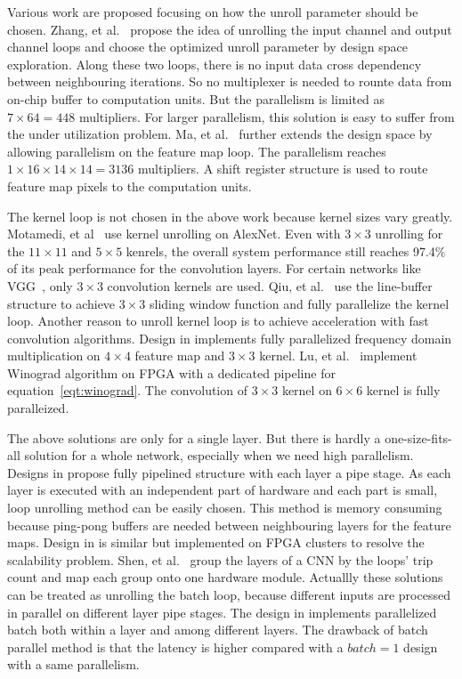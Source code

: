 Various work are proposed focusing on how the unroll parameter should be chosen. Zhang, et al.~\cite{zhang2015optimizing} propose the idea of unrolling the input channel and output channel loops and choose the optimized unroll parameter by design space exploration. Along these two loops, there is no input data cross dependency between neighbouring iterations. So no multiplexer is needed to rounte data from on-chip buffer to computation units. But the parallelism is limited as $7\times 64=448$ multipliers. For larger parallelism, this solution is easy to suffer from the under utilization problem. Ma, et al.~\cite{ma2017optimizing} further extends the design space by allowing parallelism on the feature map loop. The parallelism reaches $1\times 16\times 14\times 14=3136$ multipliers. A shift register structure is used to route feature map pixels to the computation units.

The kernel loop is not chosen in the above work because kernel sizes vary greatly. Motamedi, et al~\cite{motamedi2016design} use kernel unrolling on AlexNet. Even with $3\times 3$ unrolling for the $11\times 11$ and $5\times 5$ kenrels, the overall system performance still reaches 97.4\% of its peak performance for the convolution layers. For certain networks like VGG~\cite{simonyan2014very}, only $3\times 3$ convolution kernels are used.  Qiu, et al.~\cite{qiu2016going} use the line-buffer structure to achieve $3\times 3$ sliding window function and fully parallelize the kernel loop. Another reason to unroll kernel loop is to achieve acceleration with fast convolution algorithms. Design in \cite{zhang2017frequency} implements fully parallelized frequency domain multiplication on $4\times 4$ feature map and $3\times 3$ kernel. Lu, et al.~\cite{lu2017evaluating} implement Winograd algorithm on FPGA with a dedicated pipeline for equation~\ref{eqt:winograd}. The convolution of $3\times 3$ kernel on $6\times 6$ kernel is fully paralleized.

The above solutions are only for a single layer. But there is hardly a one-size-fits-all solution for a whole network, especially when we need high parallelism. Designs in \cite{li2016high, liu2016automatic} propose fully pipelined structure with each layer a pipe stage. As each layer is executed with an independent part of hardware and each part is small, loop unrolling method can be easily chosen. This method is memory consuming because ping-pong buffers are needed between neighbouring layers for the feature maps. Design in \cite{zhang2016energy} is similar but implemented on FPGA clusters to resolve the scalability problem. Shen, et al.~\cite{shen2016overcoming} group the layers of a CNN by the loops' trip count and map each group onto one hardware module. Actuallly these solutions can be treated as unrolling the batch loop, because different inputs are processed in parallel on different layer pipe stages. The design in \cite{lu2017evaluating} implements parallelized batch both within a layer and among different layers. The drawback of batch parallel method is that the latency is higher compared with a $batch=1$ design with a same parallelism.

